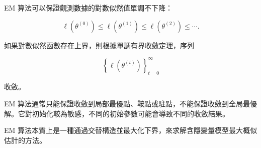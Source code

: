 EM 算法可以保證觀測數據的對數似然值單調不下降：

\begin{equation}\label{eq-monotone-sequence}
\ell(\theta^{(0)})
\le
\ell(\theta^{(1)})
\le
\ell(\theta^{(2)})
\le
\cdots.
\end{equation}

如果對數似然函數存在上界，則根據單調有界收斂定理，序列

\begin{equation}\label{eq-likelihood-sequence}
\left\{
\ell(\theta^{(t)})
\right\}_{t=0}^{\infty}
\end{equation}

收斂。

EM 算法通常只能保證收斂到局部最優點、鞍點或駐點，不能保證收斂到全局最優解。它對初始化較為敏感，不同的初始參數可能會導致不同的收斂結果。

EM 算法本質上是一種通過交替構造並最大化下界，來求解含隱變量模型最大概似估計的方法。
